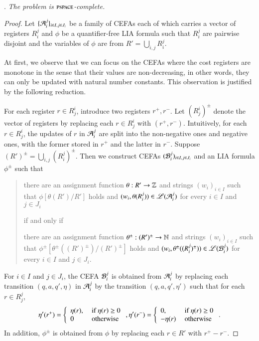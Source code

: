 .
\emph{The {\lasat} problem is $\textsc{pspace}$-complete.}
	
\begin{proof}
	Let $\{ \mathcal{A}_i^{j} \}_{i\in I,j\in J_i}$ be a family of CEFAs  each of which carries a vector of registers $R_i^j$ and  $\phi$ be a quantifier-free LIA formula such that  $ R_i^{j} $ are pairwise disjoint and the variables of $\phi$ are from $R'=\bigcup_{i,j} R_i^j$. 

At first, we observe that we can focus on the CEFAs where the cost registers are monotone in the sense that their values are non-decreasing, in other words, they can only be updated with natural number constants. This observation is justified by the following reduction.

For each register $r \in R^i_j$, introduce two registers $r^+, r^-$. Let $(R^i_j)^{\pm}$ denote the vector of registers by replacing each $r \in R^i_j$ with $(r^+, r^-)$. Intuitively,  for each $r \in R^i_j$, the updates of $r$ in $\mathcal{A}_i^{j} $ are split into the non-negative ones and negative ones, with the former stored in $r^+$ and the latter in $r^-$. Suppose $(R')^{\pm} = \bigcup_{i,j} (R_i^j)^{\pm}$. Then we construct CEFAs $(\mathcal{B}_i^{j})_{i \in I, j \in J_i}$ and an LIA formula $\phi^\pm$ such that
\begin{quote}
	there are an assignment function $\theta: R' \rightarrow \mathbb{Z}$ and strings $(w_i)_{i \in I}$ such that  $\phi[\theta(R' )/R']$ holds and $(w_i, \theta(R_i^j)) \in \mathscr{L}(\mathcal{A}_{i}^j)$ for every $i \in I$ and $j \in J_i$ 
	\begin{center} if and only if \end{center}
	there are an assignment function $\theta^\pm: (R')^\pm \rightarrow \mathbb{N}$ and strings $(w_i)_{i \in I}$ such that  $\phi^\pm[\theta^\pm((R')^\pm)/(R')^\pm]$ holds and $(w_i, \theta^\pm((R_i^j)^\pm)) \in \mathscr{L}(\mathcal{B}_{i}^j)$ for every $i \in I$ and $j \in J_i$.
\end{quote}
For $i \in I$ and $j \in J_i$, the CEFA $\mathcal{B}_{i}^j$ is obtained from $\mathcal{A}_{i}^j$ by replacing each transition $(q, a, q', \eta)$ in $\mathcal{A}_i^j$ by the transition $(q, a, q', \eta')$ such that for each $r \in R_j^j$, 
\[
\eta'(r^+) = \left\{ \begin{array}{l  l}\eta(r), & \mbox{ if } \eta(r) \ge 0 \\ 0 & \mbox{ otherwise} \end{array}\right.,  \eta'(r^-) = \left\{ \begin{array}{l  l} 0, & \mbox{ if } \eta(r) \ge 0 \\ -\eta(r) & \mbox{ otherwise} \end{array}\right..
\]
In addition, $\phi^\pm$ is obtained from $\phi$ by replacing each $r \in R'$ with $r^+-r^-$.


\end{proof}
